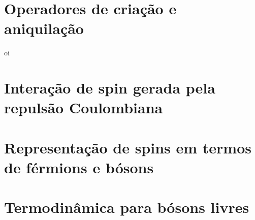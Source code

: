 \documentclass[a4paper,12pt]{article}
\begin{document}
\pagebreak



\section{Operadores de criação e aniquilação}

oi


\pagebreak



\section{Interação de spin gerada pela repulsão Coulombiana}



\pagebreak



\section{Representação de spins em termos de férmions e bósons}



\pagebreak



\section{Termodinâmica para bósons livres}
\end{document}
